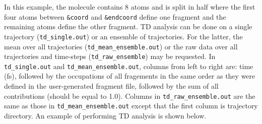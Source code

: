 \documentclass[letterpaper,12pt,titlepage]{article}
\begin{document}
In this example, the molecule contains 8 atoms and is split in half where the first four atoms between \verb+&coord+ and \verb+&endcoord+ define one fragment and the remaining atoms define the other fragment.  TD analysis can be done on a single trajectory (\verb+td_single.out+) or an ensemble of trajectories.  For the latter, the mean over all trajectories (\verb+td_mean_ensemble.out+) or the raw data over all trajectories and time-steps (\verb+td_raw_ensemble+) may be requested.  In \verb+td_single.out+ and \verb+td_mean_ensemble.out+, columns from left to right are: time (fs), followed by the occupations of all fragements in the same order as they were defined in the user-generated fragment file, followed by the sum of all contributions (should be equal to 1.0).  Columns in \verb+td_raw_ensemble.out+ are the same as those in \verb+td_mean_ensemble.out+ except that the first column is trajectory directory.  An example of performing TD analysis is shown below.
\end{document}
